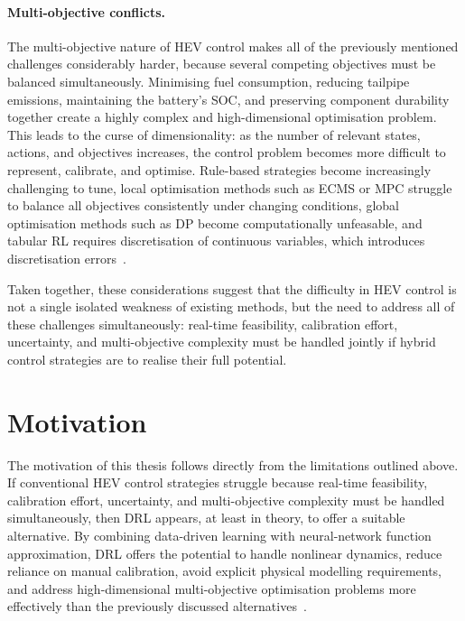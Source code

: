 \paragraph{Multi-objective conflicts.}
The multi-objective nature of HEV control makes all of the previously mentioned challenges considerably harder, because several competing objectives must be balanced simultaneously. Minimising fuel consumption, reducing tailpipe emissions, maintaining the battery's \ac{SOC}, and preserving component durability together create a highly complex and high-dimensional optimisation problem. This leads to the curse of dimensionality: as the number of relevant states, actions, and objectives increases, the control problem becomes more difficult to represent, calibrate, and optimise. Rule-based strategies become increasingly challenging to tune, local optimisation methods such as ECMS or MPC struggle to balance all objectives consistently under changing conditions, global optimisation methods such as DP become computationally unfeasable, and tabular RL requires discretisation of continuous variables, which introduces discretisation errors~\cite{tresca_cutting-edge_2025, enang_modelling_2017, tan_energy_2019, lillicrap_continuous_2019}.

Taken together, these considerations suggest that the difficulty in HEV control is not a single isolated weakness of existing methods, but the need to address all of these challenges simultaneously: real-time feasibility, calibration effort, uncertainty, and multi-objective complexity must be handled jointly if hybrid control strategies are to realise their full potential.

\section{Motivation}
The motivation of this thesis follows directly from the limitations outlined above. If conventional \ac{HEV} control strategies struggle because real-time feasibility, calibration effort, uncertainty, and multi-objective complexity must be handled simultaneously, then \ac{DRL} appears, at least in theory, to offer a suitable alternative. By combining data-driven learning with neural-network function approximation, \ac{DRL} offers the potential to handle nonlinear dynamics, reduce reliance on manual calibration, avoid explicit physical modelling requirements, and address high-dimensional multi-objective optimisation problems more effectively than the previously discussed alternatives~\cite{sutton_reinforcement_2020}.

